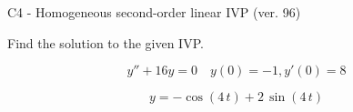 \begin{exercise}
  \begin{exerciseTitle}C4 - Homogeneous second-order linear IVP (ver. 96)\end{exerciseTitle}
  \begin{exerciseStatement}
    
Find the solution to the given IVP.

    
\[y''+16y = 0 \hspace{1em} y(0) = -1 , y'(0) = 8\]

  \end{exerciseStatement}
  \begin{exerciseAnswer}
    
\[y= -\cos\left(4 \, t\right) + 2 \, \sin\left(4 \, t\right)\]

  \end{exerciseAnswer}
\end{exercise}